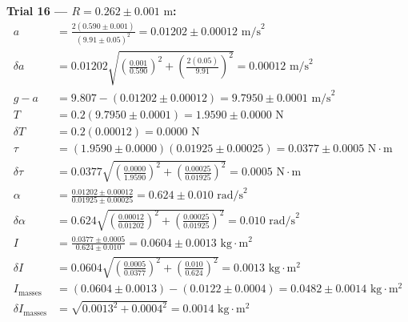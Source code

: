 \documentclass[11pt]{article}
\begin{document}
\textbf{Trial 16 — $R = 0.262 \pm 0.001\text{ m}$:}
\begin{align*}
a &= \frac{2(0.590 \pm 0.001)}{(9.91 \pm 0.05)^2} = 0.01202 \pm 0.00012\text{ m/s}^2 \\
\delta a &= 0.01202\sqrt{\left(\frac{0.001}{0.590}\right)^2 + \left(\frac{2(0.05)}{9.91}\right)^2} = 0.00012\text{ m/s}^2 \\
g - a &= 9.807 - (0.01202 \pm 0.00012) = 9.7950 \pm 0.0001\text{ m/s}^2 \\
T &= 0.2(9.7950 \pm 0.0001) = 1.9590 \pm 0.0000\text{ N} \\
\delta T &= 0.2(0.00012) = 0.0000\text{ N} \\
\tau &= (1.9590 \pm 0.0000)(0.01925 \pm 0.00025) = 0.0377 \pm 0.0005\text{ N}\cdot\text{m} \\
\delta\tau &= 0.0377\sqrt{\left(\frac{0.0000}{1.9590}\right)^2 + \left(\frac{0.00025}{0.01925}\right)^2} = 0.0005\text{ N}\cdot\text{m} \\
\alpha &= \frac{0.01202 \pm 0.00012}{0.01925 \pm 0.00025} = 0.624 \pm 0.010\text{ rad/s}^2 \\
\delta\alpha &= 0.624\sqrt{\left(\frac{0.00012}{0.01202}\right)^2 + \left(\frac{0.00025}{0.01925}\right)^2} = 0.010\text{ rad/s}^2 \\
I &= \frac{0.0377 \pm 0.0005}{0.624 \pm 0.010} = 0.0604 \pm 0.0013\text{ kg}\cdot\text{m}^2 \\
\delta I &= 0.0604\sqrt{\left(\frac{0.0005}{0.0377}\right)^2 + \left(\frac{0.010}{0.624}\right)^2} = 0.0013\text{ kg}\cdot\text{m}^2 \\
I_{\text{masses}} &= (0.0604 \pm 0.0013) - (0.0122 \pm 0.0004) = 0.0482 \pm 0.0014\text{ kg}\cdot\text{m}^2 \\
\delta I_{\text{masses}} &= \sqrt{0.0013^2 + 0.0004^2} = 0.0014\text{ kg}\cdot\text{m}^2
\end{align*}
\end{document}
